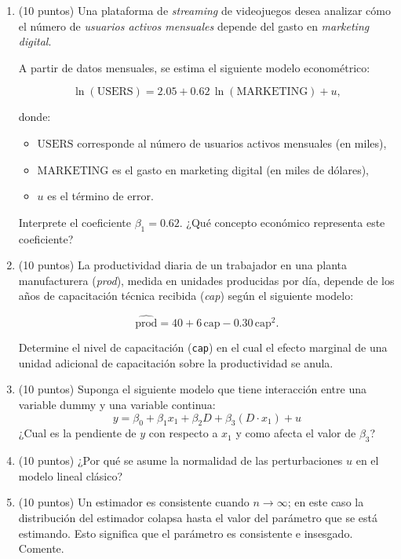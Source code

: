 \documentclass[10pt,a4paper]{article}
\begin{document}
\begin{enumerate}
\newpage
\item (10 puntos) Una plataforma de \textit{streaming} de videojuegos desea analizar cómo el número de
\textit{usuarios activos mensuales} depende del gasto en \textit{marketing digital}.

A partir de datos mensuales, se estima el siguiente modelo econométrico:

\[
\ln(\text{USERS})
= 2.05 + 0.62\,\ln(\text{MARKETING}) + u,
\]

donde:
\begin{itemize}
    \item $\text{USERS}$ corresponde al número de usuarios activos mensuales (en miles),
    \item $\text{MARKETING}$ es el gasto en marketing digital (en miles de dólares),
    \item $u$ es el término de error.
\end{itemize}

Interprete el coeficiente $\beta_1 = 0.62$.  
¿Qué concepto económico representa este coeficiente?

\vspace{5cm}
\item (10 puntos) La productividad diaria de un trabajador en una planta
manufacturera (\emph{prod}), medida en unidades producidas por día, depende
de los años de capacitación técnica recibida (\emph{cap}) según el siguiente
modelo:

\[
\widehat{\text{prod}}
= 40 + 6\,\text{cap} - 0.30\,\text{cap}^2.
\]

Determine el nivel de capacitación (\texttt{cap}) en el cual el efecto marginal
de una unidad adicional de capacitación sobre la productividad se anula.

\newpage
\item (10 puntos) Suponga el siguiente modelo que tiene interacción entre una variable dummy y una variable continua:
$$y = \beta_0 + \beta_1 x_1 + \beta_2D+\beta_3(D\cdot x_1)+u$$
¿Cual es la pendiente de $y$ con respecto a $x_1$ y como afecta el valor de $\beta_3$?
\\
\vspace{7cm}

\item (10 puntos) ¿Por qué se asume la normalidad de las perturbaciones \(u\)
        en el modelo lineal clásico? 

\newpage
 \item (10 puntos) Un estimador es consistente cuando $n \longrightarrow \infty$; en este caso la distribución del estimador colapsa hasta el valor del parámetro que se está estimando. Esto significa que el parámetro es consistente e insesgado. Comente.\\




\end{enumerate}
\end{document}
